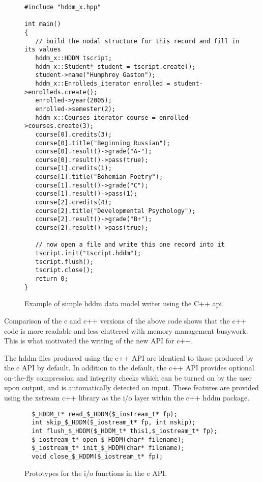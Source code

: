 \documentclass{revtex4}
\begin{document}
\begin{figure}
\begin{minipage}{12cm}
\begin{verbatim}
#include "hddm_x.hpp"

int main()
{
   // build the nodal structure for this record and fill in its values
   hddm_x::HDDM tscript;
   hddm_x::Student* student = tscript.create();
   student->name("Humphrey Gaston");
   hddm_x::Enrolleds_iterator enrolled = student->enrolleds.create();
   enrolled->year(2005);
   enrolled->semester(2);
   hddm_x::Courses_iterator course = enrolled->courses.create(3);
   course[0].credits(3);
   course[0].title("Beginning Russian");
   course[0].result()->grade("A-");
   course[0].result()->pass(true);
   course[1].credits(1);
   course[1].title("Bohemian Poetry");
   course[1].result()->grade("C");
   course[1].result()->pass(1);
   course[2].credits(4);
   course[2].title("Developmental Psychology");
   course[2].result()->grade("B+");
   course[2].result()->pass(true);

   // now open a file and write this one record into it
   tscript.init("tscript.hddm");
   tscript.flush();
   tscript.close();
   return 0;
}
\end{verbatim}
\end{minipage}
\caption{\label{writer_ex2}
Example of simple hddm data model writer using the C++ api.
}
\end{figure}

Comparison of the c and c++ versions of the above code shows that the c++ code is more 
readable and less cluttered with memory management busywork.  This is what motivated
the writing of the new API for c++.

The hddm files produced using the c++ API are identical to those produced by the c API
by default.  In addition to the default, the c++ API provides optional on-the-fly 
compression and integrity checks which can be turned on by the user upon output, and
is automatically detected on input.  These features are provided using the xstream
c++ library as the i/o layer within the c++ hddm package.

\begin{figure}
\begin{minipage}{12cm}
\begin{verbatim}
  $_HDDM_t* read_$_HDDM($_iostream_t* fp);
  int skip_$_HDDM($_iostream_t* fp, int nskip);
  int flush_$_HDDM($_HDDM_t* this1,$_iostream_t* fp);
  $_iostream_t* open_$_HDDM(char* filename);
  $_iostream_t* init_$_HDDM(char* filename);
  void close_$_HDDM($_iostream_t* fp);
\end{verbatim}
\end{minipage}
\caption{\label{prototypes}
Prototypes for the i/o functions in the c API.
}
\end{figure}
\end{document}
